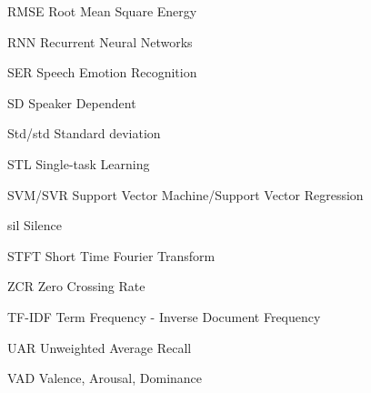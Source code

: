 \begin{abbreviations}
\item[RMSE] Root Mean Square Energy
\item[RNN]  Recurrent Neural Networks  
\item[SER]  Speech Emotion Recognition
\item[SD]   Speaker Dependent 
\item[Std/std]  Standard deviation
\item[STL]  Single-task Learning  
\item[SVM/SVR] Support Vector Machine/Support Vector Regression
\item[sil]  Silence 
\item[STFT] Short Time Fourier Transform 
\item[ZCR]  Zero Crossing Rate
\item[TF-IDF]   Term Frequency - Inverse Document Frequency
\item[UAR]  Unweighted Average Recall  
\item[VAD]  Valence, Arousal, Dominance 

\end{abbreviations}

